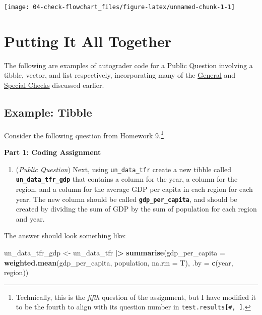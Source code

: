 \documentclass[
  12pt,
]{book}
\newenvironment{Shaded}{\begin{snugshade}}{\end{snugshade}}
\newcommand{\AttributeTok}[1]{\textcolor[rgb]{0.13,0.29,0.53}{#1}}
\newcommand{\FunctionTok}[1]{\textcolor[rgb]{0.13,0.29,0.53}{\textbf{#1}}}
\newcommand{\NormalTok}[1]{#1}
\newcommand{\OtherTok}[1]{\textcolor[rgb]{0.56,0.35,0.01}{#1}}
\newcommand{\SpecialCharTok}[1]{\textcolor[rgb]{0.81,0.36,0.00}{\textbf{#1}}}
\providecommand{\tightlist}{%
  \setlength{\itemsep}{0pt}\setlength{\parskip}{0pt}}
\begin{document}
\newpage

\begin{center}\texttt{[image: 04-check-flowchart\_files/figure-latex/unnamed-chunk-1-1]} \end{center}

\chapter{Putting It All Together}\label{Putting-It-All-Together}

The following are examples of autograder code for a Public Question involving a tibble, vector, and list respectively, incorporating many of the \hyperref[General-Checks]{General} and \hyperref[Special-Checks]{Special Checks} discussed earlier.

\section{Example: Tibble}\label{example-tibble}

Consider the following question from Homework 9.\footnote{Technically, this is the \emph{fifth} question of the assignment, but I have modified it to be the fourth to align with its question number in \texttt{test.results{[}\#,\ {]}}.}

\textbf{Part 1: Coding Assignment}

\begin{enumerate}
\def\labelenumi{\arabic{enumi}.}
\setcounter{enumi}{3}
\tightlist
\item
  (\emph{Public Question}) Next, using \texttt{un\_data\_tfr} create a new tibble called \textbf{\texttt{un\_data\_tfr\_gdp}} that contains a column for the year, a column for the region, and a column for the average GDP per capita in each region for each year. The new column should be called \textbf{\texttt{gdp\_per\_capita}}, and should be created by dividing the sum of GDP by the sum of population for each region and year.
\end{enumerate}

The answer should look something like:

\begin{Shaded}
\begin{Highlighting}[]
\NormalTok{un\_data\_tfr\_gdp }\OtherTok{\textless{}{-}}\NormalTok{ un\_data\_tfr }\SpecialCharTok{|\textgreater{}}
  \FunctionTok{summarise}\NormalTok{(}\AttributeTok{gdp\_per\_capita =} \FunctionTok{weighted.mean}\NormalTok{(gdp\_per\_capita, population, }\AttributeTok{na.rm =}\NormalTok{ T),}
            \AttributeTok{.by =} \FunctionTok{c}\NormalTok{(year, region))}
\end{Highlighting}
\end{Shaded}
\end{document}
